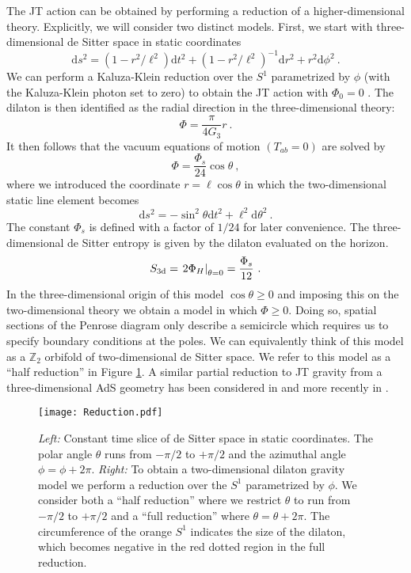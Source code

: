 \documentclass[a4paper,11pt]{article}
\newcommand{\beq}{\begin{equation}}
\newcommand{\eeq}{\end{equation}}
\newcommand{\rmd}{\mathrm{d}}
\numberwithin{equation}{section}
\begin{document}
The JT action can be obtained by performing a reduction of a higher-dimensional theory. Explicitly, we will consider two distinct models. First, we start with three-dimensional de Sitter space in static coordinates
\beq
\rmd s^2=\left(1-r^2/\ell^2\right)\rmd t^2 + \left(1-r^2/\ell^2\right)^{-1}\rmd r^2 + r^2\rmd\phi^2 ~.
\eeq
We can perform a Kaluza-Klein reduction over the $S^1$ parametrized by $\phi$ (with the Kaluza-Klein photon set to zero) to obtain the JT action with $\Phi_0=0$ \cite{Sybesma:2020fxg}. The dilaton is then identified as the radial direction in the three-dimensional theory:
\beq
\Phi = \frac{\pi}{4G_3}r ~.
\eeq
It then follows that the vacuum equations of motion $(T_{ab}=0)$ are solved by
\beq \label{eq:staticdil}
\Phi = \frac{\Phi_s}{24} \cos\theta ~,
\eeq
where we introduced the coordinate $r=\ell\cos\theta$ in which the two-dimensional static line element becomes
\beq \label{eq:staticmetric}
\rmd s^2 = -\sin^2\theta\rmd t^2 + \ell^2\rmd \theta^2 ~.
\eeq
The constant $\Phi_s$ is defined with a factor of $1/24$ for later convenience. The three-dimensional de Sitter entropy is given by the dilaton evaluated on the horizon.
\beq
S_{\rm 3d} = \left.2\Phi_H\right|_{\theta=0} = \frac{\Phi_{s}}{12}~.
\eeq
In the three-dimensional origin of this model $\cos\theta\geq 0$ and imposing this on the two-dimensional theory we obtain a model in which $\Phi\geq0$. Doing so, spatial sections of the Penrose diagram only describe a semicircle which requires us to specify boundary conditions at the poles. We can equivalently think of this model as a $\mathbb{Z}_2$ orbifold of two-dimensional de Sitter space. We refer to this model as a ``half reduction'' in Figure \ref{fig:Reduction}. A similar partial reduction to JT gravity from a three-dimensional AdS geometry has been considered in \cite{Achucarro:1993fd} and more recently in \cite{Verheijden:2021yrb}.
%
\begin{figure}[ht]
\centering
\texttt{[image: Reduction.pdf]}
\caption{\emph{Left:} Constant time slice of de Sitter space in static coordinates. The polar angle $\theta$ runs from $-\pi/2$ to $+\pi/2$ and the azimuthal angle $\phi=\phi+ 2\pi$. \emph{Right:} To obtain a two-dimensional dilaton gravity model we perform a reduction over the $S^1$ parametrized by $\phi$. We consider both a ``half reduction'' where we restrict $\theta$ to run from $-\pi/2$ to $+\pi/2$ and a ``full reduction'' where $\theta=\theta+2\pi$. The circumference of the orange $S^1$ indicates the size of the dilaton, which becomes negative in the red dotted region in the full reduction.}
\label{fig:Reduction}
\end{figure}
%
\end{document}
